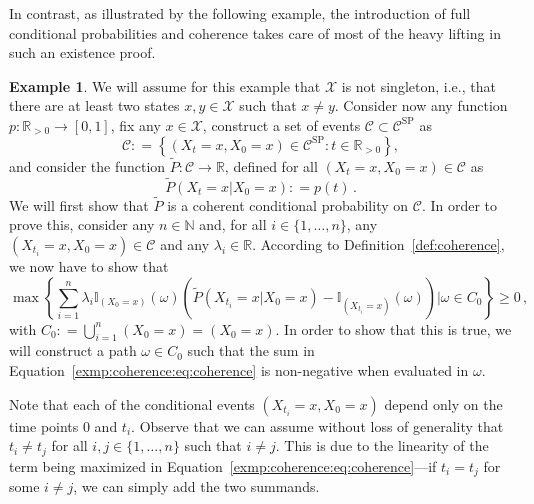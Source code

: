 \documentclass[10pt,a4paper]{paper}
\theoremstyle{definition}
\newtheorem{exmp}{Example}%
\newcommand{\nats}{\mathbb{N}}
\newcommand{\reals}{\mathbb{R}}
\newcommand{\realspos}{\reals_{>0}}
\newcommand{\states}{\mathcal{X}}
\newcommand{\ind}[1]{\mathbb{I}_{#1}}
\newcommand{\coloneqq}{:\!=}
\begin{document}
In contrast, as illustrated by the following example, the introduction of full conditional probabilities and coherence takes care of most of the heavy lifting in such an existence proof.
\begin{exmp}\label{exmp:coherence_constructs_process}
We will assume for this example that $\states$ is not singleton, i.e., that there are at least two states $x,y\in\states$ such that $x\neq y$. Consider now any function $p:\realspos\to[0,1]$, fix any $x\in\states$, construct a set of events $\mathcal{C}\subset\mathcal{C}^\mathrm{SP}$ as
\begin{equation*}
\mathcal{C} \coloneqq \left\{ (X_t=x,X_0=x)\in\mathcal{C}^\mathrm{SP} : t\in\realspos \right\},
\end{equation*}
and consider the function $\tilde{P}:\mathcal{C}\to\reals$, defined for all $(X_t=x,X_0=x)\in\mathcal{C}$ as
\begin{equation}\label{exmp:coherence:eq:probdef}
\tilde{P}(X_t=x\vert X_0=x) \coloneqq p(t)\,.
\end{equation}
We will first show that $\tilde{P}$ is a coherent conditional probability on $\mathcal{C}$. In order to prove this, consider any $n\in\nats$ and, for all $i\in\{1,\ldots,n\}$, any $(X_{t_i}=x,X_0=x)\in\mathcal{C}$ and any $\lambda_i\in\reals$. According to Definition~\ref{def:coherence}, we now have to show that
\begin{equation}\label{exmp:coherence:eq:coherence}
\max\left\{ \sum_{i=1}^n \lambda_i\ind{(X_0=x)}(\omega)\left(\tilde{P}(X_{t_i}=x\vert X_0=x) - \ind{(X_{t_i}=x)}(\omega)\right)\Big\vert \omega\in C_0 \right\} \geq 0\,,
\end{equation}
with $C_0\coloneqq \bigcup_{i=1}^n (X_0=x)=(X_0=x)$. In order to show that this is true, we will construct a path $\omega\in C_0$ such that the sum in Equation~\eqref{exmp:coherence:eq:coherence} is non-negative when evaluated in $\omega$.

Note that each of the conditional events $(X_{t_i}=x,X_0=x)$ depend only on the time points 0 and $t_i$. Observe that we can assume without loss of generality that $t_i\neq t_j$ for all $i,j\in\{1,\ldots,n\}$ such that $i\neq j$. This is due to the linearity of the term being maximized in Equation~\eqref{exmp:coherence:eq:coherence}---if $t_i=t_j$ for some $i\neq j$, we can simply add the two summands.


\end{exmp}
\end{document}
